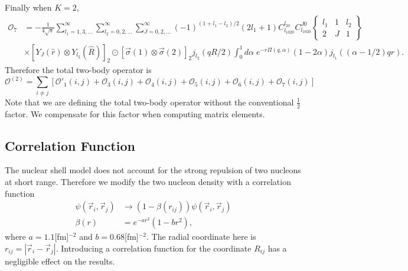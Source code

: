 \documentclass{book}[12pt]
\begin{document}
Finally when $K=2$,
\begin{equation}
\begin{split}
\mathcal{O}_7&=-\frac{1}{4\sqrt{\pi}}\sum_{l_1=1,3,...}^{\infty}\sum_{l_2=0,2,...}^{\infty}\sum_{J=0,2,...}^{\infty}(-1)^{(1+l_1-l_2)/2}(2l_1+1)C_{l_1020}^{l_20}C_{l_1020}^{J0}\left\{\begin{array}{ccc}
l_1 & 1 & l_2\\
2 & J & 1
\end{array}\right\}\\
&\times \left[Y_J(\hat{r})\otimes Y_{l_2}(\hat{R})\right]_2\odot\left[\vec{\sigma}(1)\otimes\vec{\sigma}(2)\right]_2 j_{l_2}(qR/2)\int_0^1d\alpha\;e^{-r\Pi(q,\alpha)}(1-2\alpha)j_{l_1}((\alpha-1/2)qr).
\end{split}
\end{equation}
Therefore the total two-body operator is
\begin{equation}
\mathcal{O}^{(2)}=\sum_{i\neq j}\left[\mathcal{O}'_1(i,j)+\mathcal{O}_3(i,j)+\mathcal{O}_4(i,j)+\mathcal{O}_5(i,j)+\mathcal{O}_6(i,j)+\mathcal{O}_7(i,j)\right]
\end{equation}
Note that we are defining the total two-body operator without the conventional $\frac{1}{2}$ factor. We compensate for this factor when computing matrix elements.
\subsection{Correlation Function}
\label{sec:cor_fun}
The nuclear shell model does not account for the strong repulsion of two nucleons at short range. Therefore we modify the two nucleon density with a correlation function
\begin{equation}
\begin{split}
\psi(\vec{r}_i,\vec{r}_j)&\rightarrow\left(1-\beta(r_{ij})\right)\psi(\vec{r}_i,\vec{r}_j)\\
\beta(r)&=e^{-ar^2}\left(1-br^2\right),
\label{eq:f_corr}
\end{split}
\end{equation}
where $a=1.1$[fm]$^{-2}$ and $b=0.68$[fm]$^{-2}$. The radial coordinate here is $r_{ij}=|\vec{r}_i-\vec{r}_j|$. Introducing a correlation function for the coordinate $R_{ij}$ has a negligible effect on the results. 
\end{document}
